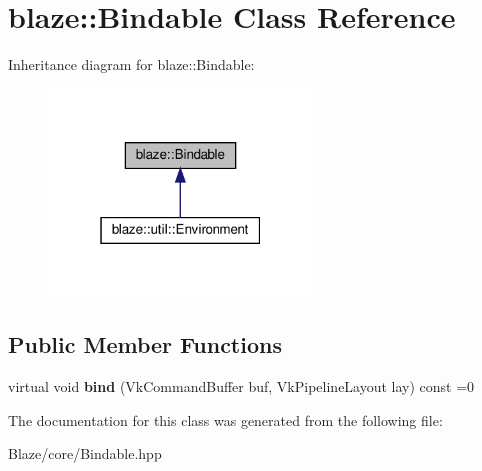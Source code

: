 \hypertarget{classblaze_1_1Bindable}{}\section{blaze\+:\+:Bindable Class Reference}
\label{classblaze_1_1Bindable}


Inheritance diagram for blaze\+:\+:Bindable\+:\nopagebreak
\begin{figure}[H]
\begin{center}
\leavevmode
\includegraphics[width=199pt]{classblaze_1_1Bindable__inherit__graph}
\end{center}
\end{figure}
\subsection*{Public Member Functions}
\begin{DoxyCompactItemize}
\item 
\mbox{\label{classblaze_1_1Bindable_adb5efe3a8b600f17e0ae3e0b48c63ccd}} 
virtual void {\bfseries bind} (Vk\+Command\+Buffer buf, Vk\+Pipeline\+Layout lay) const =0
\end{DoxyCompactItemize}


The documentation for this class was generated from the following file\+:\begin{DoxyCompactItemize}
\item 
Blaze/core/Bindable.\+hpp\end{DoxyCompactItemize}
